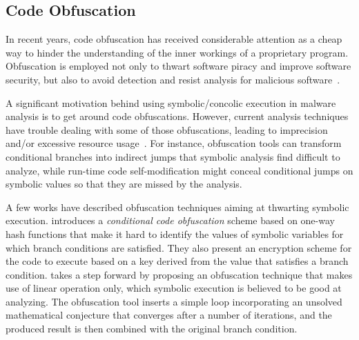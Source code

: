 \subsection{Code Obfuscation}
In recent years, code obfuscation has received considerable attention as a cheap way to hinder the understanding of the inner workings of a proprietary program. Obfuscation is employed not only to thwart software piracy and improve software security, but also to avoid detection and resist analysis for malicious software~\cite{UDM-WCRE15,YJW-SSP15}.

A significant motivation behind using symbolic/concolic execution in malware analysis is to get around code obfuscations. However, current analysis techniques have trouble dealing with some of those obfuscations, leading to imprecision and/or excessive resource usage~\cite{YD-CCS15}. For instance, obfuscation tools can transform conditional branches into indirect jumps that symbolic analysis find difficult to analyze, while run-time code self-modification might conceal conditional jumps on symbolic values so that they are missed by the analysis.

A few works have described obfuscation techniques aiming at thwarting symbolic execution. \cite{SLG-NDSS08} introduces a {\em conditional code obfuscation} scheme based on one-way hash functions that make it hard to identify the values of symbolic variables for which branch conditions are satisfied. They also present an encryption scheme for the code to execute based on a key derived from the value that satisfies a branch condition. %
\cite{WMJ-ESORICS11} takes a step forward by proposing an obfuscation technique that makes use of linear operation only, which symbolic execution is believed to be good at analyzing. %
The obfuscation tool inserts a simple loop incorporating an unsolved mathematical conjecture that converges after a number of iterations, and the produced result is then combined with the original branch condition. %

